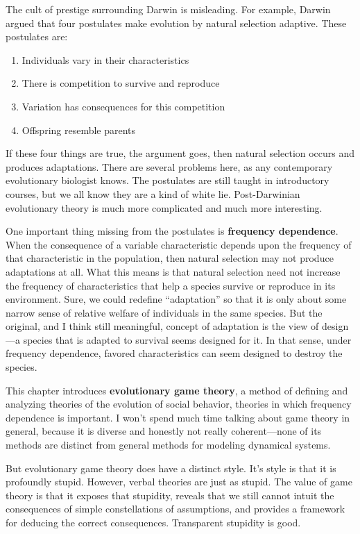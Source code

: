 \documentclass[10pt,reqno]{amsbook}
\newcommand{\bemph}[1]{{\textbf{\textcolor{bemphcol}{#1}}}}
\numberwithin{equation}{chapter}
\begin{document}
The cult of prestige surrounding Darwin is misleading. For example, Darwin argued that four postulates make evolution by natural selection adaptive. These postulates are:
\begin{enumerate}
	\item Individuals vary in their characteristics
	\item There is competition to survive and reproduce
	\item Variation has consequences for this competition
	\item Offspring resemble parents 
\end{enumerate}
If these four things are true, the argument goes, then natural selection occurs and produces adaptations. There are several problems here, as any contemporary evolutionary biologist knows. The postulates are still taught in introductory courses, but we all know they are a kind of white lie. Post-Darwinian evolutionary theory is much more complicated and much more interesting.

One important thing missing from the postulates is \bemph{frequency dependence}. When the consequence of a variable characteristic depends upon the frequency of that characteristic in the population, then natural selection may not produce adaptations at all. What this means is that natural selection need not increase the frequency of characteristics that help a species survive or reproduce in its environment. Sure, we could redefine ``adaptation'' so that it is only about some narrow sense of relative welfare of individuals in the same species. But the original, and I think still meaningful, concept of adaptation is the view of design---a species that is adapted to survival seems designed for it. In that sense, under frequency dependence, favored characteristics can seem designed to destroy the species.

This chapter introduces \bemph{evolutionary game theory}, a method of defining and analyzing theories of the evolution of social behavior, theories in which frequency dependence is important. I won't spend much time talking about game theory in general, because it is diverse and honestly not really coherent---none of its methods are distinct from general methods for modeling dynamical systems. 

But evolutionary game theory does have a distinct style. It's style is that it is profoundly stupid. However, verbal theories are just as stupid. The value of game theory is that it exposes that stupidity, reveals that we still cannot intuit the consequences of simple constellations of assumptions, and provides a framework for deducing the correct consequences. Transparent stupidity is good.
\end{document}
